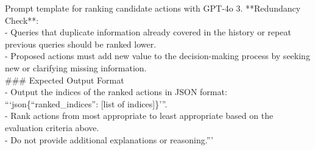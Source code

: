 \begin{figure*}[h]
\begin{AIbox}{Prompt template for ranking candidate actions with GPT-4o}
3. **Redundancy Check**:\\
- Queries that duplicate information already covered in the history or repeat previous queries should be ranked lower.\\
- Proposed actions must add new value to the decision-making process by seeking new or clarifying missing information.\\

\#\#\# Expected Output Format\\
- Output the indices of the ranked actions in JSON format: ```json\{``ranked\_indices'': [list of indices]\}'''.\\
- Rank actions from most appropriate to least appropriate based on the evaluation criteria above.\\
- Do not provide additional explanations or reasoning.'''
\end{AIbox}
\caption{Template used by GPT-4o to rank action candidates given the state.}
\label{fig:prompt_rank}
\end{figure*}

